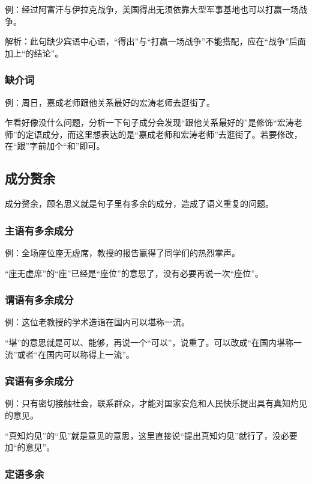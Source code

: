 例：经过阿富汗与伊拉克战争，美国得出无须依靠大型军事基地也可以打赢一场战争。

解析：此句缺少宾语中心语，“得出”与“打赢一场战争”不能搭配，应在“战争”后面加上“的结论”。

\subsubsection{缺介词}

例：周日，嘉成老师跟他关系最好的宏涛老师去逛街了。

乍看好像没什么问题，分析一下句子成分会发现“跟他关系最好的”是修饰“宏涛老师”的定语成分，而这里想表达的是“嘉成老师和宏涛老师”去逛街了。若要修改，在“跟”字前加个“和”即可。

\subsection{成分赘余}

成分赘余，顾名思义就是句子里有多余的成分，造成了语义重复的问题。

\subsubsection{主语有多余成分}

例：全场座位座无虚席，教授的报告赢得了同学们的热烈掌声。

“座无虚席”的“座”已经是“座位”的意思了，没有必要再说一次“座位”。

\subsubsection{谓语有多余成分}

例：这位老教授的学术造诣在国内可以堪称一流。

“堪”的意思就是可以、能够，再说一个“可以”，说重了。可以改成“在国内堪称一流”或者“在国内可以称得上一流”。

\subsubsection{宾语有多余成分}

例：只有密切接触社会，联系群众，才能对国家安危和人民快乐提出具有真知灼见的意见。

“真知灼见”的“见”就是意见的意思，这里直接说“提出真知灼见”就行了，没必要加“的意见”。

\subsubsection{定语多余}

